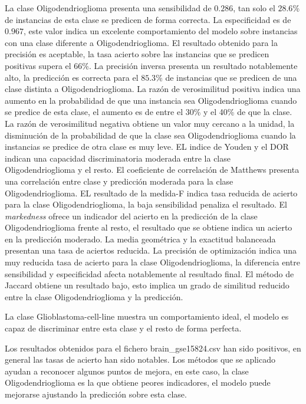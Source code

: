 La clase Oligodendrioglioma presenta una sensibilidad de $0.286$, tan solo el $28.6$\% de instancias de esta clase se predicen de forma correcta. La especificidad es de $0.967$, este valor indica un excelente comportamiento del modelo sobre instancias con una clase diferente a Oligodendrioglioma. El resultado obtenido para la precisión es aceptable, la tasa acierto sobre las instancias que se predicen positivas supera el $66$\%. La precisión inversa presenta un resultado notablemente alto, la predicción es correcta para el $85.3$\% de instancias que se predicen de una clase distinta a Oligodendrioglioma. La razón de verosimilitud positiva indica una aumento en la probabilidad de que una instancia sea Oligodendrioglioma cuando se predice de esta clase, el aumento es de entre el 30\% y el 40\% de que la clase. La razón de verosimilitud negativa obtiene un valor muy cercano a la unidad, la disminución de la probabilidad de que la clase sea Oligodendrioglioma cuando la instancias se predice de otra clase es muy leve. EL indice de Youden y el DOR indican una capacidad discriminatoria moderada entre la clase Oligodendrioglioma y el resto. El coeficiente de correlación de Matthews presenta una correlación entre clase y predicción moderada para la clase Oligodendrioglioma. EL resultado de la medida-F indica tasa reducida de acierto para la clase Oligodendrioglioma, la baja sensibilidad penaliza el resultado. El \textit{markedness} ofrece un indicador del acierto en la predicción de la clase Oligodendrioglioma frente al resto, el resultado que se obtiene indica un acierto en la predicción moderado. La media geométrica y la exactitud balanceada presentan una tasa de aciertos reducida. La precisión de optimización indica una muy reducida tasa de acierto para la clase Oligodendrioglioma, la diferencia entre sensibilidad y especificidad afecta notablemente al resultado final. El método de Jaccard obtiene un resultado bajo, esto implica un grado de similitud reducido entre la clase Oligodendrioglioma y la predicción.

\bigbreak

La clase Glioblastoma-cell-line muestra un comportamiento ideal, el modelo es capaz de discriminar entre esta clase y el resto de forma perfecta.

\bigbreak

Los resultados obtenidos para el fichero brain\_gse15824.csv han sido positivos, en general las tasas de acierto han sido notables. Los métodos que se aplicado ayudan a reconocer algunos puntos de mejora, en este caso, la clase Oligodendrioglioma es la que obtiene peores indicadores, el modelo puede mejorarse ajustando la predicción sobre esta clase.

